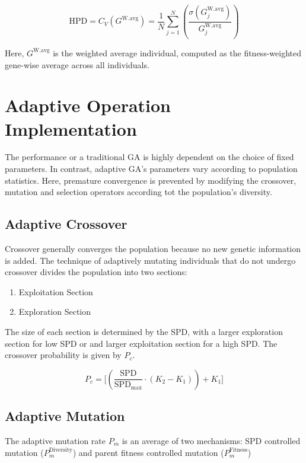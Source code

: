 \documentclass[../main.tex]{subfiles}
\begin{document}
\begin{equation}
\text{HPD} = C_V(G^{\text{W.avg}}) = \frac{1}{N} \sum_{j=1}^N \left( \frac{\sigma
(G^{\text{W.avg}}_j)}{G^{\text{W.avg}}_j} \right)
\end{equation}

Here, $G^{\text{W.avg}}$ is the weighted average individual, computed as the fitness-weighted gene-wise average across
all individuals.

\section{Adaptive Operation Implementation}

The performance or a traditional GA is highly dependent on the choice of fixed parameters. In contrast, adaptive GA's
parameters vary according to population statistics. Here, premature convergence is prevented by modifying the
crossover, mutation and selection operators according tot the population's diversity.

\subsection{Adaptive Crossover}

Crossover generally converges the population because no new genetic information is  added. The technique of adaptively
mutating individuals that do not undergo crossover divides the population into two sections:

\begin{enumerate}
	\item Exploitation Section
	\item Exploration Section
\end{enumerate}

The size of each section is determined by the SPD, with a larger exploration section for low SPD or and larger
exploitation section for a high SPD. The crossover probability is given by $P_c$.

\begin{equation}
P_c = \bigg[ \left( \frac{\text{SPD}}{\text{SPD}_\text{max}} \cdot (K_2 - K_1) \right) + K_1 \bigg]
\end{equation}

\subsection{Adaptive Mutation}
The adaptive mutation rate $P_m$ is an average of two mechanisms: SPD controlled mutation ($P_m^{\text{Diversity}}$)
and parent fitness controlled mutation ($P_m^{\text{Fitness}}$)
\end{document}
